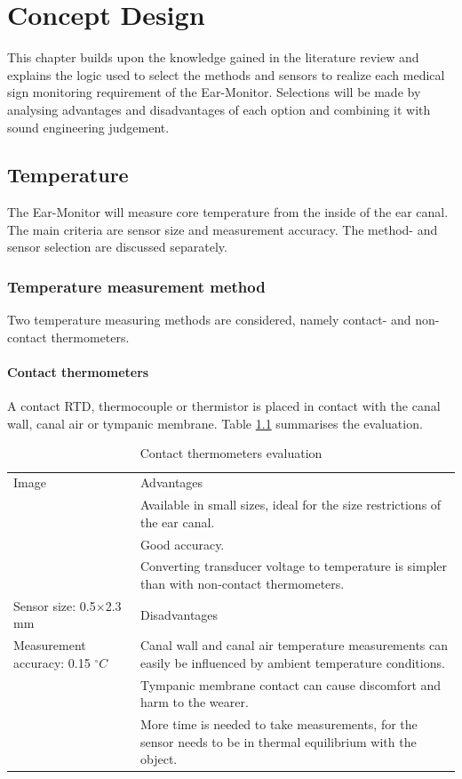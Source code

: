 \chapter{Concept Design}
\label{chp:ConceptDesign}
This chapter builds upon the knowledge gained in the literature review and explains the logic used to select the methods and sensors to realize each medical sign monitoring requirement of the Ear-Monitor. Selections will be made by analysing advantages and disadvantages of each option and combining it with sound engineering judgement.

\section{Temperature}
The Ear-Monitor will measure core temperature from the inside of the ear canal. The main criteria are sensor size and measurement accuracy. The method- and sensor selection are discussed separately.

\subsection{Temperature measurement method}
Two temperature measuring methods are considered, namely contact- and non-contact thermometers.

\subsubsection{Contact thermometers}
A contact RTD, thermocouple or thermistor is placed in contact with the canal wall, canal air or tympanic membrane. Table \ref{tab:ContactThermometers_Eval} summarises the evaluation.

\begin{table}[H]
\caption{Contact thermometers evaluation}
\label{tab:ContactThermometers_Eval}
\renewcommand{\arraystretch}{1.3}	%
\centering
\begin{tabular}{|p{5cm}|p{8cm}|} 
 \hline
 Image 						& 	Advantages\\ 
							&	\tabitem Available in small sizes, ideal for the size restrictions of the ear canal.\\
  							&	\tabitem Good accuracy.\\
  							&	\tabitem Converting transducer voltage to temperature is simpler than with non-contact thermometers.\\
\hline
Sensor size: 0.5$\times$2.3 mm				& 	Disadvantages\\ 
Measurement accuracy: 0.15 $^{\circ}C$ 		&	\tabitem Canal wall and canal air temperature measurements can easily be influenced by ambient temperature conditions.\\
  											&	\tabitem Tympanic membrane contact can cause discomfort and harm to the wearer.\\
  											&	\tabitem More time is needed to take measurements, for the sensor needs to be in thermal equilibrium with the object.\\
 \hline
\end{tabular}
\end{table}

